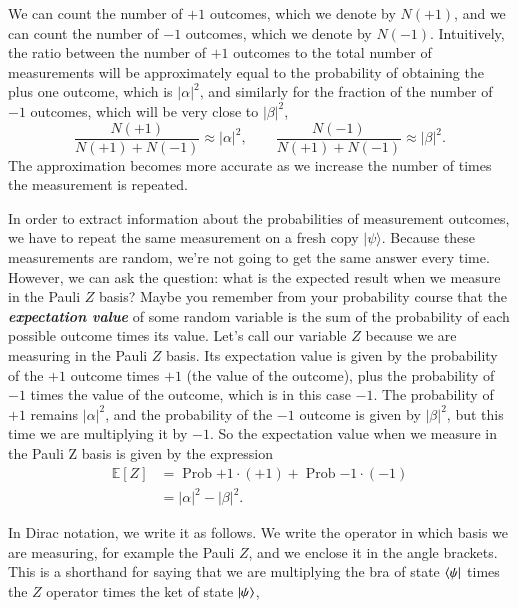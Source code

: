 We can count the number of $+1$ outcomes, which we denote by $N(+1)$, and we can count the number of $-1$ outcomes, which we denote by $N(-1)$. Intuitively, the ratio between the number of $+1$ outcomes to the total number of measurements will be approximately equal to the probability of obtaining the plus one outcome, which is $|\alpha|^2$, and similarly for the fraction of the number of $-1$ outcomes, which will be very close to $|\beta|^2$,
\begin{equation}
    \frac{N(+1)}{N(+1)+N(-1)} \approx|\alpha|^{2}, \qquad \frac{N(-1)}{N(+1)+N(-1)} \approx|\beta|^{2}.
\end{equation}
The approximation becomes more accurate as we increase the number of times the measurement is repeated.

In order to extract information about the probabilities of measurement outcomes, we have to repeat the same measurement on a fresh copy $|\psi\rangle$. Because these measurements are random, we're not going to get the same answer every time. However, we can ask the question: what is the expected result when we measure in the Pauli $Z$ basis? Maybe you remember from your probability course that the \textbf{\emph{expectation value}} of some random variable is the sum of the probability of each possible outcome times its value. Let's call our variable $Z$ because we are measuring in the Pauli $Z$ basis.  Its expectation value is given by the probability of the $+1$ outcome times $+1$ (the value of the outcome), plus the probability of $-1$ times the value of the outcome, which is in this case $-1$.  The probability of $+1$ remains $|\alpha|^2$, and the probability of the $-1$ outcome is given by $|\beta|^2$, but this time we are multiplying it by $-1$. So the expectation value when we measure in the Pauli Z basis is given by the expression
\begin{equation}
\begin{aligned}
    \mathbb{E}[Z] &=\operatorname{Prob}{+1} \cdot(+1)+\operatorname{Prob}{-1} \cdot(-1) \\
    &=|\alpha|^{2}-|\beta|^{2}.
    \label{eq:expectation_Z}
\end{aligned}
\end{equation}

In Dirac notation, we write it as follows. We write the operator in which basis we are measuring, for example the Pauli $Z$, and we enclose it in the angle brackets. This is a shorthand for saying that we are multiplying the bra of state $\left\langle \psi \right|$ times the $Z$ operator times the ket of state $\left| \psi \right\rangle$,

